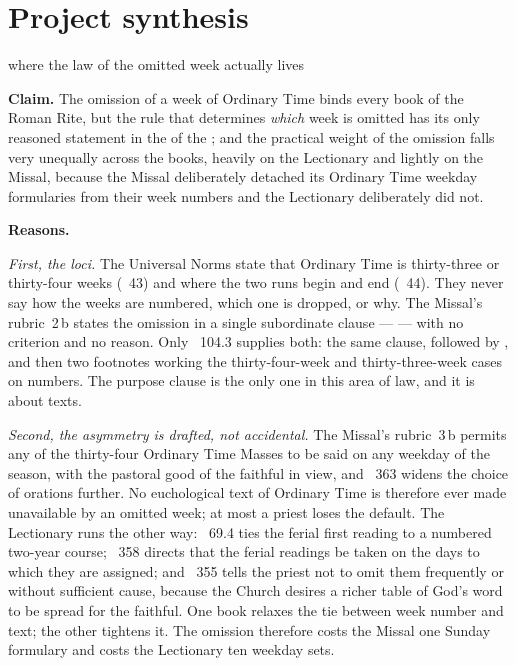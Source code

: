 \section{Project synthesis}
\label{sec:synthesis}

\begin{synthesis}{where the law of the omitted week actually lives}

\textbf{Claim.} The omission of a week of Ordinary Time binds every book of the Roman Rite, but the
rule that determines \emph{which} week is omitted has its only reasoned statement in the
 of the ; and the practical weight of the omission
falls very unequally across the books, heavily on the Lectionary and lightly on the Missal, because
the Missal deliberately detached its Ordinary Time weekday formularies from their week numbers and
the Lectionary deliberately did not.

\textbf{Reasons.}

\emph{First, the loci.} The Universal Norms state that Ordinary Time is thirty-three or thirty-four
weeks (~43) and where the two runs begin and end (~44). They never say how the
weeks are numbered, which one is dropped, or why. The Missal's rubric~2\,b states the omission in a
single subordinate clause --- 
--- with no criterion and no reason. Only ~104.3 supplies both: the same clause, followed by
,
and then two footnotes working the thirty-four-week and thirty-three-week cases on numbers. The
purpose clause is the only one in this area of law, and it is about texts.

\emph{Second, the asymmetry is drafted, not accidental.} The Missal's rubric~3\,b permits any of the
thirty-four Ordinary Time Masses to be said on any weekday of the season, with the pastoral good of
the faithful in view, and ~363 widens the choice of orations further. No euchological text
of Ordinary Time is therefore ever made unavailable by an omitted week; at most a priest loses the
default. The Lectionary runs the other way: ~69.4 ties the ferial first reading to a
numbered two-year course; ~358 directs that the ferial readings be taken on the days to
which they are assigned; and ~355 tells the priest not to omit them frequently or without
sufficient cause, because the Church desires a richer table of God's word to be spread for the
faithful. One book relaxes the tie between week number and text; the other tightens it. The omission
therefore costs the Missal one Sunday formulary and costs the Lectionary ten weekday sets.


\end{synthesis}
